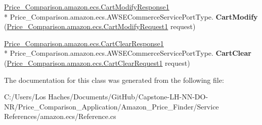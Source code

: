 \begin{DoxyCompactItemize}
\item 
\hypertarget{class_price___comparison_1_1amazon_1_1ecs_1_1_a_w_s_e_commerce_service_port_type_client_a29ca55de94917ada87037e034797b30b}{\hyperlink{class_price___comparison_1_1amazon_1_1ecs_1_1_cart_modify_response1}{Price\-\_\-\-Comparison.\-amazon.\-ecs.\-Cart\-Modify\-Response1} \\*
Price\-\_\-\-Comparison.\-amazon.\-ecs.\-A\-W\-S\-E\-Commerce\-Service\-Port\-Type. {\bfseries Cart\-Modify} (\hyperlink{class_price___comparison_1_1amazon_1_1ecs_1_1_cart_modify_request1}{Price\-\_\-\-Comparison.\-amazon.\-ecs.\-Cart\-Modify\-Request1} request)}\label{class_price___comparison_1_1amazon_1_1ecs_1_1_a_w_s_e_commerce_service_port_type_client_a29ca55de94917ada87037e034797b30b}

\item 
\hypertarget{class_price___comparison_1_1amazon_1_1ecs_1_1_a_w_s_e_commerce_service_port_type_client_aa71d923e4b2df70ed722c0d46efb762f}{\hyperlink{class_price___comparison_1_1amazon_1_1ecs_1_1_cart_clear_response1}{Price\-\_\-\-Comparison.\-amazon.\-ecs.\-Cart\-Clear\-Response1} \\*
Price\-\_\-\-Comparison.\-amazon.\-ecs.\-A\-W\-S\-E\-Commerce\-Service\-Port\-Type. {\bfseries Cart\-Clear} (\hyperlink{class_price___comparison_1_1amazon_1_1ecs_1_1_cart_clear_request1}{Price\-\_\-\-Comparison.\-amazon.\-ecs.\-Cart\-Clear\-Request1} request)}\label{class_price___comparison_1_1amazon_1_1ecs_1_1_a_w_s_e_commerce_service_port_type_client_aa71d923e4b2df70ed722c0d46efb762f}

\end{DoxyCompactItemize}


The documentation for this class was generated from the following file\-:\begin{DoxyCompactItemize}
\item 
C\-:/\-Users/\-Los Haches/\-Documents/\-Git\-Hub/\-Capstone-\/\-L\-H-\/\-N\-N-\/\-D\-O-\/\-N\-R/\-Price\-\_\-\-Comparison\-\_\-\-Application/\-Amazon\-\_\-\-Price\-\_\-\-Finder/\-Service References/amazon.\-ecs/Reference.\-cs\end{DoxyCompactItemize}
